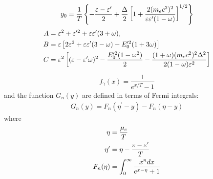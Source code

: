 \documentclass[10pt,preprint]{aastex}
\begin{document}
\begin{align}
y_0 = \dfrac{1}{T}\left\lbrace - \dfrac{\varepsilon -\varepsilon^\prime}{2} + \dfrac{\Delta}{2} \left[1+\dfrac{2(m_e c^2)^2}{\varepsilon \varepsilon^\prime (1-\omega)}\right]^{1/2} \right\rbrace 
\end{align}
\begin{align}
A &= \varepsilon^2 + \varepsilon^{\prime 2} + \varepsilon \varepsilon^\prime(3+\omega),\\
B &= \varepsilon \left[ 2\varepsilon^2 + \varepsilon \varepsilon^\prime(3-\omega) - E^{\prime 2}_0(1+3\omega) \right] \\
C &= \varepsilon^2\left[ (\varepsilon -\varepsilon^\prime \omega)^2 - \dfrac{E^{\prime 2}_0 (1-\omega^2)}{2} - \dfrac{(1+\omega)(m_e c^2)^2 \Delta^2}{2(1-\omega)\varepsilon^2} \right] 
\end{align}
\begin{align}
f_{\gamma}(x) = \dfrac{1}{e^{x/T} - 1}
\end{align}
and the function $G_n(y)$ are defined in terms of Fermi integrals:
\begin{align}
G_n(y) = F_n(\eta^\prime - y) - F_n(\eta - y)
\end{align}
where
\begin{align}
\eta &= \dfrac{\mu_e}{T} \\
\eta^\prime &= \eta - \dfrac{\varepsilon - \varepsilon^\prime}{T} \\
F_n(\eta) &= \int_{0}^{\infty} \dfrac{x^n dx}{e^{x-\eta}+1}
\end{align}
\end{document}
